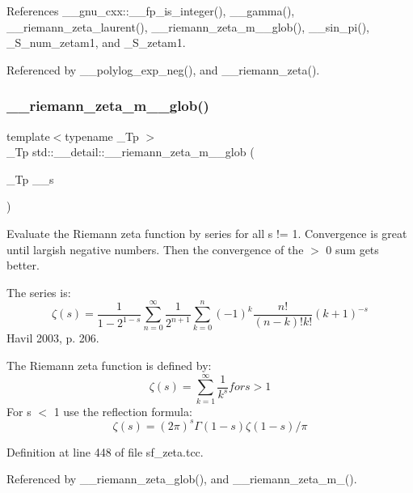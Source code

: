 References \+\_\+\+\_\+gnu\+\_\+cxx\+::\+\_\+\+\_\+fp\+\_\+is\+\_\+integer(), \+\_\+\+\_\+gamma(), \+\_\+\+\_\+riemann\+\_\+zeta\+\_\+laurent(), \+\_\+\+\_\+riemann\+\_\+zeta\+\_\+m\+\_\+\_\+glob(), \+\_\+\+\_\+sin\+\_\+pi(), \+\_\+\+S\+\_\+num\+\_\+zetam1, and \+\_\+\+S\+\_\+zetam1.



Referenced by \+\_\+\+\_\+polylog\+\_\+exp\+\_\+neg(), and \+\_\+\+\_\+riemann\+\_\+zeta().

\mbox{\label{namespacestd_1_1____detail_ac7a15aa2658fef76642cebd7858fa0ff}} 
\subsubsection{\texorpdfstring{\+\_\+\+\_\+riemann\+\_\+zeta\+\_\+m\+\_\+\_\+glob()}{\_\_riemann\_zeta\_m\_1\_glob()}}
{\footnotesize\ttfamily template$<$typename \+\_\+\+Tp $>$ \\
\+\_\+\+Tp std\+::\+\_\+\+\_\+detail\+::\+\_\+\+\_\+riemann\+\_\+zeta\+\_\+m\+\_\+\_\+glob (\begin{DoxyParamCaption}\item[{\+\_\+\+Tp}]{\+\_\+\+\_\+s }\end{DoxyParamCaption})}



Evaluate the Riemann zeta function by series for all s != 1. Convergence is great until largish negative numbers. Then the convergence of the $>$ 0 sum gets better. 

The series is\+: \[ \zeta(s) = \frac{1}{1-2^{1-s}} \sum_{n=0}^{\infty} \frac{1}{2^{n+1}} \sum_{k=0}^{n} (-1)^k \frac{n!}{(n-k)!k!} (k+1)^{-s} \] Havil 2003, p. 206.

The Riemann zeta function is defined by\+: \[ \zeta(s) = \sum_{k=1}^{\infty} \frac{1}{k^{s}} for s > 1 \] For s $<$ 1 use the reflection formula\+: \[ \zeta(s) = (2\pi)^s \Gamma(1-s) \zeta(1-s) / \pi \] 

Definition at line 448 of file sf\+\_\+zeta.\+tcc.



Referenced by \+\_\+\+\_\+riemann\+\_\+zeta\+\_\+glob(), and \+\_\+\+\_\+riemann\+\_\+zeta\+\_\+m\+\_().

